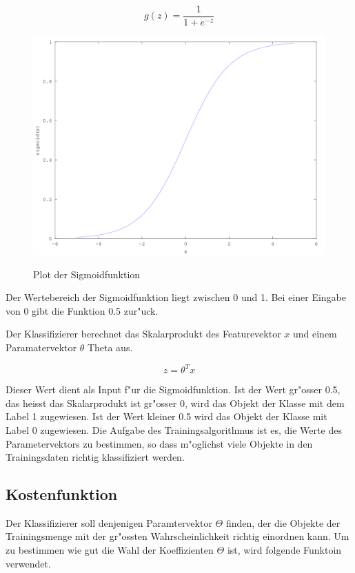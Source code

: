 \documentclass[12pt,a4paper,twoside]{article}
\begin{document}
\[
g(z) = \frac{1}{1 + e^{-z}}
\]


\begin{figure}
  \includegraphics[scale=0.5]{sigmoid}
  \centering
  \label{fig:sigmoidfunc}
  \caption{Plot der Sigmoidfunktion}
\end{figure}

Der Wertebereich der Sigmoidfunktion liegt zwischen 0 und 1. Bei einer Eingabe von 0 gibt die Funktion 0.5 zur"uck.

Der Klassifizierer berechnet das Skalarprodukt des Featurevektor $x$ und einem Paramatervektor $\theta$ Theta aus.

\[
z = \theta^T x
\]

Dieser Wert dient als Input f"ur die Sigmoidfunktion. Ist der Wert gr"osser 0.5, das heisst das Skalarprodukt ist gr"osser 0, wird das Objekt der Klasse mit dem Label 1 zugewiesen. Ist der Wert kleiner 0.5 wird das Objekt der Klasse mit Label 0 zugewiesen. Die Aufgabe des Trainingsalgorithmus ist es, die Werte des Parametervektors zu bestimmen, so dass m"oglichst viele Objekte in den Trainingsdaten richtig klassifiziert werden. 

\subsection{Kostenfunktion}
\label{sec:costfunction}

Der Klassifizierer soll denjenigen Paramtervektor $\Theta$ finden, der die Objekte der Trainingsmenge mit der gr"ossten Wahrscheinlichkeit richtig einordnen kann. Um zu bestimmen wie gut die Wahl der Koeffizienten $\Theta$ ist, wird folgende Funktoin verwendet.
\end{document}
